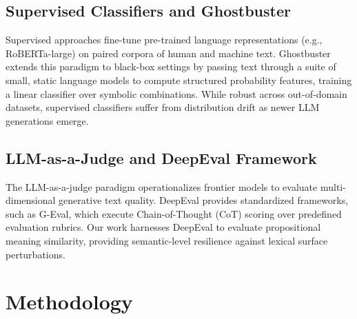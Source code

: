 \documentclass[conference]{IEEEtran}
\begin{document}
\subsection{Supervised Classifiers and Ghostbuster}
Supervised approaches fine-tune pre-trained language representations (e.g., RoBERTa-large) on paired corpora of human and machine text. Ghostbuster \cite{verma2024ghostbuster} extends this paradigm to black-box settings by passing text through a suite of small, static language models to compute structured probability features, training a linear classifier over symbolic combinations. While robust across out-of-domain datasets, supervised classifiers suffer from distribution drift as newer LLM generations emerge.

\subsection{LLM-as-a-Judge and DeepEval Framework}
The LLM-as-a-judge paradigm \cite{zheng2023judging} operationalizes frontier models to evaluate multi-dimensional generative text quality. DeepEval \cite{deepeval2023} provides standardized frameworks, such as G-Eval, which execute Chain-of-Thought (CoT) scoring over predefined evaluation rubrics. Our work harnesses DeepEval to evaluate propositional meaning similarity, providing semantic-level resilience against lexical surface perturbations.

\section{Methodology}
\end{document}
